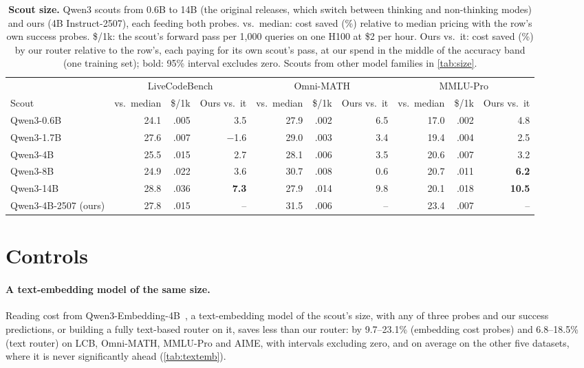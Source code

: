 \documentclass[10pt]{article}
\begin{document}
\begin{table}[t]
\centering
\footnotesize
\setlength{\tabcolsep}{3.5pt}
\begin{tabular}{lrrrrrrrrr}
\toprule
 & \multicolumn{3}{c}{LiveCodeBench} & \multicolumn{3}{c}{Omni-MATH} & \multicolumn{3}{c}{MMLU-Pro} \\
\cmidrule(lr){2-4}\cmidrule(lr){5-7}\cmidrule(lr){8-10}
Scout & vs.\ median & \$/1k & Ours vs.\ it & vs.\ median & \$/1k & Ours vs.\ it & vs.\ median & \$/1k & Ours vs.\ it \\
\midrule
Qwen3-0.6B & 24.1 & .005 & 3.5 & 27.9 & .002 & 6.5 & 17.0 & .002 & 4.8 \\
Qwen3-1.7B & 27.6 & .007 & $-$1.6 & 29.0 & .003 & 3.4 & 19.4 & .004 & 2.5 \\
Qwen3-4B & 25.5 & .015 & 2.7 & 28.1 & .006 & 3.5 & 20.6 & .007 & 3.2 \\
Qwen3-8B & 24.9 & .022 & 3.6 & 30.7 & .008 & 0.6 & 20.7 & .011 & \textbf{6.2} \\
Qwen3-14B & 28.8 & .036 & \textbf{7.3} & 27.9 & .014 & 9.8 & 20.1 & .018 & \textbf{10.5} \\
\midrule
Qwen3-4B-2507 (ours) & 27.8 & .015 & -- & 31.5 & .006 & -- & 23.4 & .007 & -- \\
\bottomrule
\end{tabular}
\caption{\textbf{Scout size.} Qwen3 scouts from 0.6B to 14B (the original releases, which switch between thinking and non-thinking modes) and ours (4B Instruct-2507), each feeding both probes. vs.\ median: cost saved (\%) relative to median pricing with the row's own success probes. \$/1k: the scout's forward pass per 1,000 queries on one H100 at \$2 per hour. Ours vs.\ it: cost saved (\%) by our router relative to the row's, each paying for its own scout's pass, at our spend in the middle of the accuracy band (one training set); bold: 95\% interval excludes zero. Scouts from other model families in \cref{tab:size}.}
\label{tab:scale}
\end{table}

\section{Controls}\label{sec:ablations}
\paragraph{A text-embedding model of the same size.}
Reading cost from Qwen3-Embedding-4B~\citep{qwen3emb}, a text-embedding model of the scout's size, with any of three probes and our success predictions, or building a fully text-based router on it, saves less than our router: by 9.7--23.1\% (embedding cost probes) and 6.8--18.5\% (text router) on LCB, Omni-MATH, MMLU-Pro and AIME, with intervals excluding zero, and on average on the other five datasets, where it is never significantly ahead (\cref{tab:textemb}).
\end{document}
